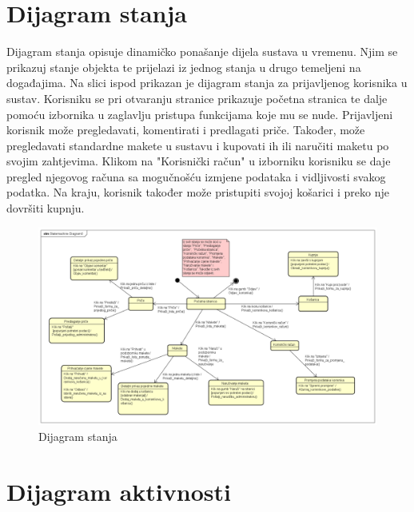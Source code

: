		\section{Dijagram stanja}
			
			
			Dijagram stanja opisuje dinamičko ponašanje dijela sustava u vremenu. Njim se prikazuj stanje objekta te prijelazi iz jednog stanja u drugo temeljeni na događajima. Na slici ispod prikazan je dijagram stanja za prijavljenog korisnika u sustav. Korisniku se pri otvaranju stranice prikazuje početna stranica te dalje pomoću izbornika u zaglavlju pristupa funkcijama koje mu se nude. Prijavljeni korisnik može pregledavati, komentirati i predlagati priče. Također, može pregledavati standardne makete u sustavu i kupovati ih ili naručiti maketu po svojim zahtjevima. Klikom na "Korisnički račun" u izborniku korisniku se daje pregled njegovog računa sa mogučnošću izmjene podataka i vidljivosti svakog podatka. Na kraju, korisnik također može pristupiti svojoj košarici i preko nje dovršiti kupnju.
			
			\begin{figure}[H]
				\includegraphics[width=1\linewidth]{slike/Dijagram_stanja.PNG} %
				\caption{Dijagram stanja}
				\label{fig:dijstan} %
			\end{figure}
			
			
			\eject 
		
		\section{Dijagram aktivnosti}
			
